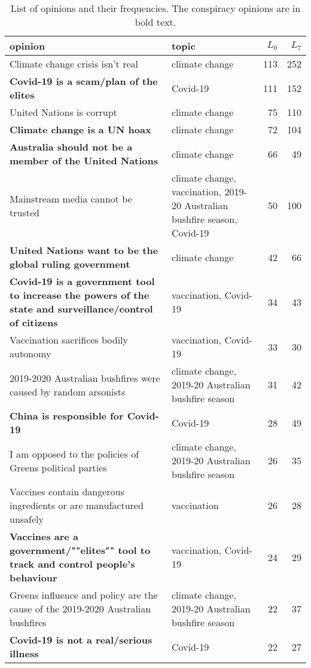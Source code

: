 
\clearpage
\begin{table*}
\caption{\label{tab:opinion_list}List of opinions and their frequencies. The conspiracy opinions are in bold text.}

\centering
\scriptsize
\begin{tabular}{p{8cm}p{4cm}rr}
\toprule
opinion & topic & $L_0$ & $L_7$\\
\midrule
Climate change crisis isn't real & climate change & 113 & 252\\
\textbf{Covid-19 is a scam/plan of the elites} & Covid-19 & 111 & 152\\
United Nations is corrupt & climate change & 75 & 110\\
\textbf{Climate change is a UN hoax} & climate change & 72 & 104\\
\textbf{Australia should not be a member of the United Nations} & climate change & 66 & 49\\
\addlinespace
Mainstream media cannot be trusted & climate change, vaccination, 2019-20 Australian bushfire season, Covid-19 & 50 & 100\\
\textbf{United Nations want to be the global ruling government} & climate change & 42 & 66\\
\textbf{Covid-19 is a government tool to increase the powers of the state and surveillance/control of citizens} & vaccination, Covid-19 & 34 & 43\\
Vaccination sacrifices bodily autonomy & vaccination, Covid-19 & 33 & 30\\
2019-2020 Australian bushfires were caused by random arsonists & climate change, 2019-20 Australian bushfire season & 31 & 42\\
\addlinespace
\textbf{China is responsible for Covid-19} & Covid-19 & 28 & 49\\
I am opposed to the policies of Greens political parties & climate change, 2019-20 Australian bushfire season & 26 & 35\\
Vaccines contain dangerous ingredients or are manufactured unsafely & vaccination & 26 & 28\\
\textbf{Vaccines are a government/""elites"" tool to track and control people's behaviour} & vaccination, Covid-19 & 24 & 29\\
Greens influence and policy are the cause of the 2019-2020 Australian bushfires & climate change, 2019-20 Australian bushfire season & 22 & 37\\
\addlinespace
\textbf{Covid-19 is not a real/serious illness} & Covid-19 & 22 & 27\\

\end{tabular}
\end{table*}
